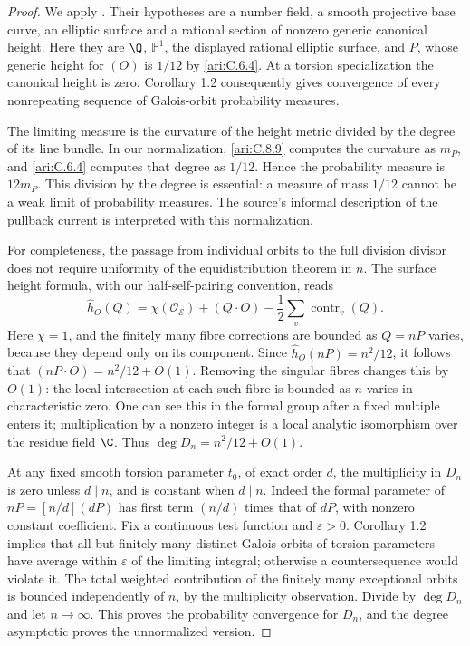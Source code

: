 \begin{proof}
We apply \citet[Theorem 1.1 and Corollary 1.2]{demarco2017}.
Their hypotheses are a number field, a smooth projective
base curve, an elliptic surface and a rational section of
nonzero generic canonical height. Here they are $\Q$,
$\mathbb P^1$, the displayed rational elliptic surface,
and $P$, whose generic height for $(O)$ is $1/12$ by \ref{ari:C.6.4}.
At a torsion specialization the canonical height is zero.
Corollary 1.2 consequently gives convergence of every
nonrepeating sequence of Galois-orbit probability measures.

The limiting measure is the curvature of the height metric
divided by the degree of its line bundle. In our normalization,
\ref{ari:C.8.9} computes the curvature as $m_P$, and \ref{ari:C.6.4} computes
that degree as $1/12$. Hence the probability measure is
$12m_P$. This division by the degree is essential: a measure
of mass $1/12$ cannot be a weak limit of probability measures.
The source's informal description of the pullback current
is interpreted with this normalization.

For completeness, the passage from individual orbits to
the full division divisor does not require uniformity of
the equidistribution theorem in $n$. The surface height
formula, with our half-self-pairing convention, reads
\[
 \widehat h_O(Q)=\chi(\mathcal O_{\mathcal E})+(Q\cdot O)
                -\frac12\sum_v\operatorname{contr}_v(Q).
\]
Here $\chi=1$, and the finitely many fibre corrections are
bounded as $Q=nP$ varies, because they depend only on its
component. Since $\widehat h_O(nP)=n^2/12$, it follows
that $(nP\cdot O)=n^2/12+O(1)$. Removing the singular fibres
changes this by $O(1)$: the local intersection at each
such fibre is bounded as $n$ varies in characteristic zero.
One can see this in the formal group after a fixed
multiple enters it; multiplication by a nonzero integer
is a local analytic isomorphism over the residue field
$\C$. Thus $\deg D_n=n^2/12+O(1)$.

At any fixed smooth torsion parameter $t_0$, of exact order
$d$, the multiplicity in $D_n$ is zero unless $d\mid n$,
and is constant when $d\mid n$. Indeed the formal parameter
of $nP=[n/d](dP)$ has first term $(n/d)$ times that of $dP$,
with nonzero constant coefficient. Fix a continuous test
function and $\varepsilon>0$. Corollary 1.2 implies that
all but finitely many distinct Galois orbits of torsion
parameters have average within $\varepsilon$ of the limiting
integral; otherwise a countersequence would violate it.
The total weighted contribution of the finitely many
exceptional orbits is bounded independently of $n$, by
the multiplicity observation. Divide by $\deg D_n$ and
let $n\to\infty$. This proves the probability convergence
for $D_n$, and the degree asymptotic proves the unnormalized
version.
\end{proof}

